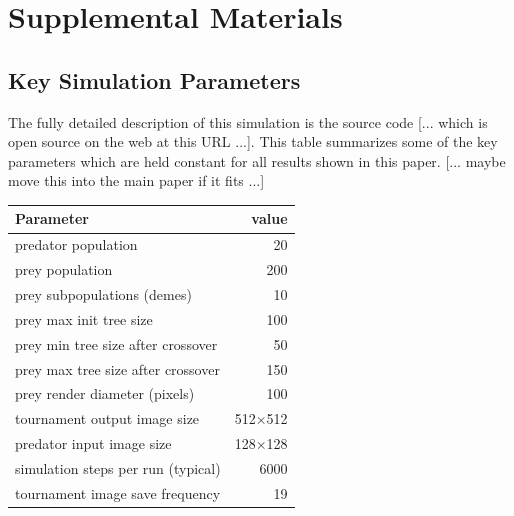 \documentclass[acmtog]{acmart}
\begin{document}





\newpage
\onecolumn
\appendix
\section{Supplemental Materials}


\subsection{Key Simulation Parameters}
The fully detailed description of this simulation is the source code [... which is open source on the web at this URL ...]. This table summarizes some of the key parameters which are held constant for all results shown in this paper. [... maybe move this into the main paper if it fits ...]
\par

\begin{adjustwidth}{1cm}{0cm}
    \begin{tabular}{ |l|r| } 
        \hline
        \textbf{Parameter} & \textbf{value} \\ 
        \hline
        predator population & 20 \\ 
        prey population & 200 \\ 
        prey subpopulations (demes) & 10 \\
        prey max init tree size & 100 \\
        prey min tree size after crossover & 50 \\
        prey max tree size after crossover & 150 \\
        \hline
        prey render diameter (pixels) & 100 \\ 
        tournament output image size & 512×512 \\ 
        predator input image size & 128×128 \\ 
        \hline
        simulation steps per run (typical) & 6000 \\
        tournament image save frequency & 19 \\
        \hline
    \end{tabular}
\end{adjustwidth}
\end{document}
